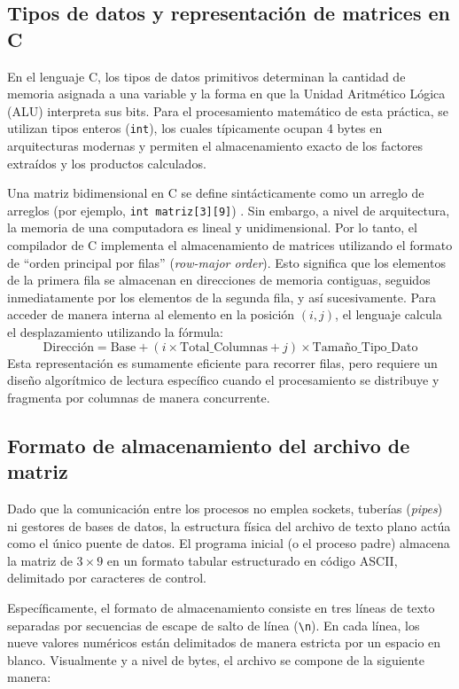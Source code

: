 \subsection{Tipos de datos y representación de matrices en C}
\label{sec:prac02:tipos-datos}
En el lenguaje C, los tipos de datos primitivos determinan la cantidad de memoria asignada a una variable y la forma en que la Unidad Aritmético Lógica (ALU) interpreta sus bits. Para el procesamiento matemático de esta práctica, se utilizan tipos enteros (\texttt{int}), los cuales típicamente ocupan 4 bytes en arquitecturas modernas y permiten el almacenamiento exacto de los factores extraídos y los productos calculados.

Una matriz bidimensional en C se define sintácticamente como un arreglo de arreglos (por ejemplo, \texttt{int matriz[3][9]}) \cite{w3schools:c-arrays-multi:2026}. Sin embargo, a nivel de arquitectura, la memoria de una computadora es lineal y unidimensional. Por lo tanto, el compilador de C implementa el almacenamiento de matrices utilizando el formato de ``orden principal por filas'' (\textit{row-major order}). Esto significa que los elementos de la primera fila se almacenan en direcciones de memoria contiguas, seguidos inmediatamente por los elementos de la segunda fila, y así sucesivamente. Para acceder de manera interna al elemento en la posición $(i, j)$, el lenguaje calcula el desplazamiento utilizando la fórmula:
\[ \text{Dirección} = \text{Base} + (i \times \text{Total\_Columnas} + j) \times \text{Tamaño\_Tipo\_Dato} \]
Esta representación es sumamente eficiente para recorrer filas, pero requiere un diseño algorítmico de lectura específico cuando el procesamiento se distribuye y fragmenta por columnas de manera concurrente.

\subsection{Formato de almacenamiento del archivo de matriz}
\label{sec:prac02:formato}
Dado que la comunicación entre los procesos no emplea sockets, tuberías (\textit{pipes}) ni gestores de bases de datos, la estructura física del archivo de texto plano actúa como el único puente de datos. El programa inicial (o el proceso padre) almacena la matriz de $3 \times 9$ en un formato tabular estructurado en código ASCII, delimitado por caracteres de control.

Específicamente, el formato de almacenamiento consiste en tres líneas de texto separadas por secuencias de escape de salto de línea (\texttt{\textbackslash n}). En cada línea, los nueve valores numéricos están delimitados de manera estricta por un espacio en blanco. Visualmente y a nivel de bytes, el archivo se compone de la siguiente manera:

